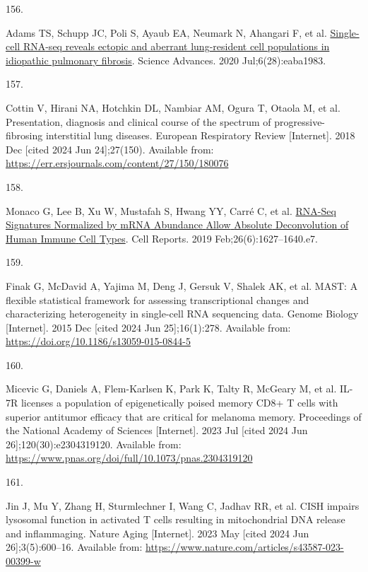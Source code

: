 \documentclass[
]{article}
\newlength{\cslhangindent}
\newlength{\csllabelwidth}
\newenvironment{CSLReferences}[2] %
 {\begin{list}{}{%
  \setlength{\itemindent}{0pt}
  \setlength{\leftmargin}{0pt}
  \setlength{\parsep}{0pt}
  \ifodd #1
   \setlength{\leftmargin}{\cslhangindent}
   \setlength{\itemindent}{-1\cslhangindent}
  \fi
  \setlength{\itemsep}{#2\baselineskip}}}
 {\end{list}}
\newcommand{\CSLLeftMargin}[1]{\parbox[t]{\csllabelwidth}{\strut#1\strut}}
\newcommand{\CSLRightInline}[1]{\parbox[t]{\linewidth - \csllabelwidth}{\strut#1\strut}}
\begin{document}
\begin{CSLReferences}{0}{1}
\CSLLeftMargin{156. }%
\CSLRightInline{Adams TS, Schupp JC, Poli S, Ayaub EA, Neumark N, Ahangari F, et al. \href{https://doi.org/10.1126/sciadv.aba1983}{Single-cell {RNA}-seq reveals ectopic and aberrant lung-resident cell populations in idiopathic pulmonary fibrosis}. Science Advances. 2020 Jul;6(28):eaba1983. }

\CSLLeftMargin{157. }%
\CSLRightInline{Cottin V, Hirani NA, Hotchkin DL, Nambiar AM, Ogura T, Otaola M, et al. Presentation, diagnosis and clinical course of the spectrum of progressive-fibrosing interstitial lung diseases. European Respiratory Review {[}Internet{]}. 2018 Dec {[}cited 2024 Jun 24{]};27(150). Available from: \url{https://err.ersjournals.com/content/27/150/180076}}

\CSLLeftMargin{158. }%
\CSLRightInline{Monaco G, Lee B, Xu W, Mustafah S, Hwang YY, Carré C, et al. \href{https://doi.org/10.1016/j.celrep.2019.01.041}{{RNA}-{Seq} {Signatures} {Normalized} by {mRNA} {Abundance} {Allow} {Absolute} {Deconvolution} of {Human} {Immune} {Cell} {Types}}. Cell Reports. 2019 Feb;26(6):1627--1640.e7. }

\CSLLeftMargin{159. }%
\CSLRightInline{Finak G, McDavid A, Yajima M, Deng J, Gersuk V, Shalek AK, et al. {MAST}: A flexible statistical framework for assessing transcriptional changes and characterizing heterogeneity in single-cell {RNA} sequencing data. Genome Biology {[}Internet{]}. 2015 Dec {[}cited 2024 Jun 25{]};16(1):278. Available from: \url{https://doi.org/10.1186/s13059-015-0844-5}}

\CSLLeftMargin{160. }%
\CSLRightInline{Micevic G, Daniels A, Flem-Karlsen K, Park K, Talty R, McGeary M, et al. {IL}-{7R} licenses a population of epigenetically poised memory {CD8}+ {T} cells with superior antitumor efficacy that are critical for melanoma memory. Proceedings of the National Academy of Sciences {[}Internet{]}. 2023 Jul {[}cited 2024 Jun 26{]};120(30):e2304319120. Available from: \url{https://www.pnas.org/doi/full/10.1073/pnas.2304319120}}

\CSLLeftMargin{161. }%
\CSLRightInline{Jin J, Mu Y, Zhang H, Sturmlechner I, Wang C, Jadhav RR, et al. {CISH} impairs lysosomal function in activated {T} cells resulting in mitochondrial {DNA} release and inflammaging. Nature Aging {[}Internet{]}. 2023 May {[}cited 2024 Jun 26{]};3(5):600--16. Available from: \url{https://www.nature.com/articles/s43587-023-00399-w}}


\end{CSLReferences}
\end{document}
